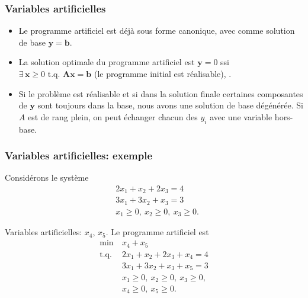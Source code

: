 \documentclass[usepdftitle=false]{beamer}
\def\bb{\boldsymbol{b}}
\def\bx{\boldsymbol{x}}
\def\by{\boldsymbol{y}}
\def\bA{\boldsymbol{A}}
\begin{document}
\begin{frame}
\frametitle{Variables artificielles}

\begin{itemize}
\item 
Le programme artificiel est déjà sous forme canonique, avec comme solution de base $\by = \bb$.
\item 
La solution optimale du programme artificiel est $\by = 0$ ssi $\exists\, \bx \geq 0 \mbox{ t.q. } \bA\bx = \bb$ (le programme initial est réalisable), .
\item 
Si le problème est réalisable et si dans la solution finale certaines composantes de $\by$ sont toujours dans la base, nous avons une solution de base dégénérée. Si $A$ est de rang plein, on peut échanger chacun des $y_i$ avec une variable hors-base.
\end{itemize}

\end{frame}

\begin{frame}
\frametitle{Variables artificielles: exemple}

Considérons le système
\begin{align*}
& 2x_1 + x_2 + 2x_3 = 4 \\
& 3x_1 + 3x_2 + x_3 = 3 \\
& x_1 \geq 0,\ x_2 \geq 0,\ x_3 \geq 0.
\end{align*}

\mbox{}

Variables artificielles: $x_4$, $x_5$. Le programme artificiel est
\begin{align*}
\min\ & x_4 + x_5 \\
\mbox{t.q. }
& 2x_1 + x_2 + 2x_3 + x_4 = 4 \\
& 3x_1 + 3x_2 + x_3 + x_5 = 3 \\
& x_1 \geq 0,\ x_2 \geq 0,\ x_3 \geq 0, \\
& x_4 \geq 0,\ x_5 \geq 0.
\end{align*}

\end{frame}
\end{document}
